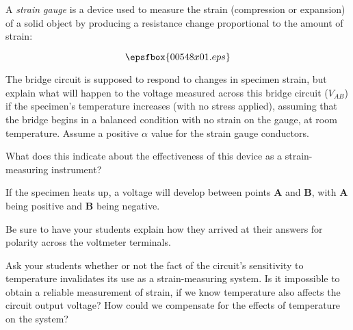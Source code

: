 

A {\it strain gauge} is a device used to measure the strain (compression or expansion) of a solid object by producing a resistance change proportional to the amount of strain:

$$\epsfbox{00548x01.eps}$$

The bridge circuit is supposed to respond to changes in specimen strain, but explain what will happen to the voltage measured across this bridge circuit ($V_{AB}$) if the specimen's temperature increases (with no stress applied), assuming that the bridge begins in a balanced condition with no strain on the gauge, at room temperature.  Assume a positive $\alpha$ value for the strain gauge conductors.

What does this indicate about the effectiveness of this device as a strain-measuring instrument?







If the specimen heats up, a voltage will develop between points {\bf A} and {\bf B}, with {\bf A} being positive and {\bf B} being negative.







Be sure to have your students explain how they arrived at their answers for polarity across the voltmeter terminals.

Ask your students whether or not the fact of the circuit's sensitivity to temperature invalidates its use as a strain-measuring system.  Is it impossible to obtain a reliable measurement of strain, if we know temperature also affects the circuit output voltage?  How could we compensate for the effects of temperature on the system?




